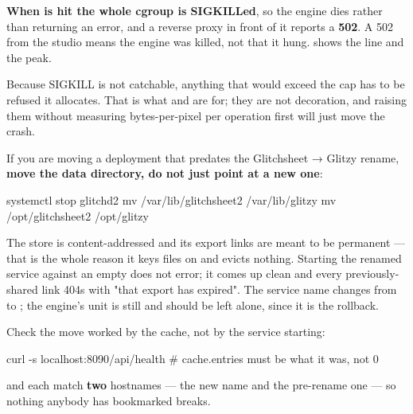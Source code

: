 \documentclass[fontpath=fonts/,logopath=logo/]{riposte-doc}
\begin{document}
\textbf{When  is hit the whole cgroup is SIGKILLed}, so the engine dies rather than returning an error, and a reverse proxy in front of it reports a \textbf{502}. A 502 from the studio means the engine was killed, not that it hung.  shows the  line and the peak.

Because SIGKILL is not catchable, anything that would exceed the cap has to be refused  it allocates. That is what  and  are for; they are not decoration, and raising them without measuring bytes-per-pixel per operation first will just move the crash.



If you are moving a deployment that predates the Glitchsheet → Glitzy rename, \textbf{move the data directory, do not just point at a new one}:

\ripcodeopen
{}
\begin{ripcodeblock}
systemctl stop glitchd2
mv /var/lib/glitchsheet2 /var/lib/glitzy
mv /opt/glitchsheet2     /opt/glitzy
\end{ripcodeblock}
\ripcodesizereset\ripcodeclose

The store is content-addressed and its export links are meant to be permanent — that is the whole reason it keys files on  and evicts nothing. Starting the renamed service against an empty  does not error; it comes up clean and every previously-shared link 404s with "that export has expired". The service name changes from  to ; the  engine's unit is still  and should be left alone, since it is the rollback.

Check the move worked by the cache, not by the service starting:

\ripcodeopen
{}
\begin{ripcodeblock}
curl -s localhost:8090/api/health   # cache.entries must be what it was, not 0
\end{ripcodeblock}
\ripcodesizereset\ripcodeclose



 and  each match \textbf{two} hostnames — the new name and the pre-rename one — so nothing anybody has bookmarked breaks.
\end{document}
